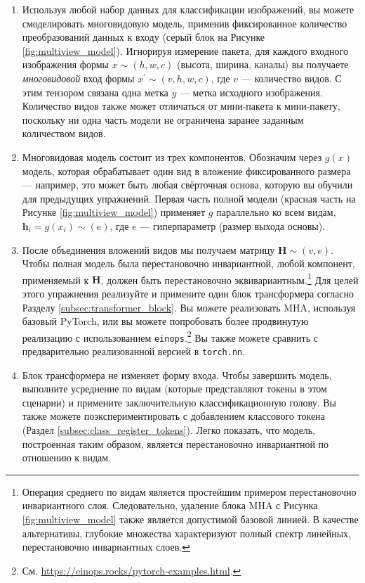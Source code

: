 \begin{enumerate}
\item Используя любой набор данных для классификации изображений, вы можете смоделировать многовидовую модель, применив фиксированное количество преобразований данных к входу (серый блок на Рисунке \ref{fig:multiview_model}). Игнорируя измерение пакета, для каждого входного изображения формы $x \sim (h,w,c)$ (высота, ширина, каналы) вы получаете \textit{многовидовой} вход формы $x^\prime \sim (v,h,w,c)$, где $v$ — количество видов. С этим тензором связана одна метка $y$ — метка исходного изображения. Количество видов также может отличаться от мини-пакета к мини-пакету, поскольку ни одна часть модели не ограничена заранее заданным количеством видов.
\item Многовидовая модель состоит из трех компонентов. Обозначим через $g(x)$ модель, которая обрабатывает один вид в вложение фиксированного размера — например, это может быть любая свёрточная основа, которую вы обучили для предыдущих упражнений. Первая часть полной модели (красная часть на Рисунке \ref{fig:multiview_model}) применяет $g$ параллельно ко всем видам, $\mathbf{h}_i = g(x_i) \sim (e)$, где $e$ — гиперпараметр (размер выхода основы).
\item После объединения вложений видов мы получаем матрицу $\mathbf{H} \sim (v, e)$. Чтобы полная модель была перестановочно инвариантной, любой компонент, применяемый к $\mathbf{H}$, должен быть перестановочно эквивариантным.\footnote{Операция среднего по видам является простейшим примером перестановочно инвариантного слоя. Следовательно, удаление блока MHA с Рисунка \ref{fig:multiview_model} также является допустимой базовой линией. В качестве альтернативы, глубокие множества \cite{zaheer2017deep} характеризуют полный спектр линейных, перестановочно инвариантных слоев.} Для целей этого упражнения реализуйте и примените один блок трансформера согласно Разделу \ref{subsec:transformer_block}. Вы можете реализовать MHA, используя базовый PyTorch, или вы можете попробовать более продвинутую реализацию с использованием \texttt{einops}.\footnote{См. \url{https://einops.rocks/pytorch-examples.html}.} Вы также можете сравнить с предварительно реализованной версией в \texttt{torch.nn}.
\item Блок трансформера не изменяет форму входа. Чтобы завершить модель, выполните усреднение по видам (которые представляют токены в этом сценарии) и примените заключительную классификационную голову. Вы также можете поэкспериментировать с добавлением классового токена (Раздел \ref{subsec:class_register_tokens}). Легко показать, что модель, построенная таким образом, является перестановочно инвариантной по отношению к видам.
\end{enumerate}

